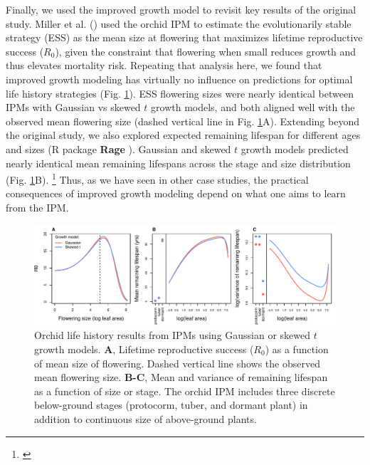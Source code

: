 \documentclass[12pt]{article}
\newcommand{\tom}[2]{{\color{red}{#1}}\footnote{\textit{\color{red}{#2}}}}
\begin{document}
Finally, we used the improved growth model to revisit key results of the original study. 
Miller et al. (\citeyear{miller2012evolutionary}) used the orchid IPM to estimate the evolutionarily stable strategy (ESS) as the mean size at flowering that maximizes lifetime reproductive success ($R_0$), given the constraint that flowering when small reduces growth and thus elevates mortality risk. 
Repeating that analysis here, we found that improved growth modeling has virtually no influence on predictions for optimal life history strategies (Fig. \ref{fig:orchid_ESS}).
ESS flowering sizes were nearly identical between IPMs with Gaussian vs skewed $t$ growth models, and both aligned well with the observed mean flowering size (dashed vertical line in Fig. \ref{fig:orchid_ESS}A). 
Extending beyond the original study, we also explored expected remaining lifespan for different ages and sizes (R package \textbf{Rage} \citep{jones2022rcompadre}). 
Gaussian and skewed $t$ growth models predicted nearly identical mean remaining lifespans across the stage and size distribution (Fig. \ref{fig:orchid_ESS}B).
\tom{However, the skewed $t$ model predicted consistently greater variance in remaining lifespan, nearly 10\% greater at some sizes.}{Do not believe this result! I have left it here as a placeholder because I would like to do this correctly. But I think there are problems with Rage's life\_expect\_var() function. The predicted variance declines linearly with matrix dimension.} 
Thus, as we have seen in other case studies, the practical consequences of improved growth modeling depend on what one aims to learn from the IPM. 

\begin{figure}[tbp]
	\centering
	\includegraphics[width=1.0\textwidth]{figures/orchis_life_history.pdf}
	\caption{Orchid life history results from IPMs using Gaussian or skewed $t$ growth models. \textbf{A}, Lifetime reproductive success ($R_0$) as a function of mean size of flowering. Dashed vertical line shows the observed mean flowering size. \textbf{B-C}, Mean and variance of remaining lifespan as a function of size or stage. The orchid IPM includes three discrete below-ground stages (protocorm, tuber, and dormant plant) in addition to continuous size of above-ground plants.}
	\label{fig:orchid_ESS}
\end{figure} 
\end{document}
